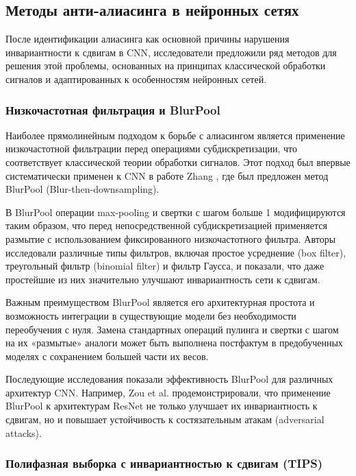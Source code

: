 \subsection{Методы анти-алиасинга в нейронных сетях}
\label{review:antialias}

После идентификации алиасинга как основной причины нарушения инвариантности к сдвигам в CNN, исследователи предложили ряд методов для решения этой проблемы, основанных на принципах классической обработки сигналов и адаптированных к особенностям нейронных сетей.

\subsubsection{Низкочастотная фильтрация и BlurPool}
\label{review:antialias:blurpool}

Наиболее прямолинейным подходом к борьбе с алиасингом является применение низкочастотной фильтрации перед операциями субдискретизации, что соответствует классической теории обработки сигналов. Этот подход был впервые систематически применен к CNN в работе Zhang \cite{Zhang2019blurpool}, где был предложен метод BlurPool (Blur-then-downsampling).

В BlurPool операции max-pooling и свертки с шагом больше 1 модифицируются таким образом, что перед непосредственной субдискретизацией применяется размытие с использованием фиксированного низкочастотного фильтра. Авторы исследовали различные типы фильтров, включая простое усреднение (box filter), треугольный фильтр (binomial filter) и фильтр Гаусса, и показали, что даже простейшие из них значительно улучшают инвариантность сети к сдвигам.

Важным преимуществом BlurPool является его архитектурная простота и возможность интеграции в существующие модели без необходимости переобучения с нуля. Замена стандартных операций пулинга и свертки с шагом на их «размытые» аналоги может быть выполнена постфактум в предобученных моделях с сохранением большей части их весов.

Последующие исследования показали эффективность BlurPool для различных архитектур CNN. Например, Zou et al. \cite{zou2020delving} продемонстрировали, что применение BlurPool к архитектурам ResNet не только улучшает их инвариантность к сдвигам, но и повышает устойчивость к состязательным атакам (adversarial attacks).

\subsubsection{Полифазная выборка с инвариантностью к сдвигам (TIPS)}
\label{review:antialias:tips}


